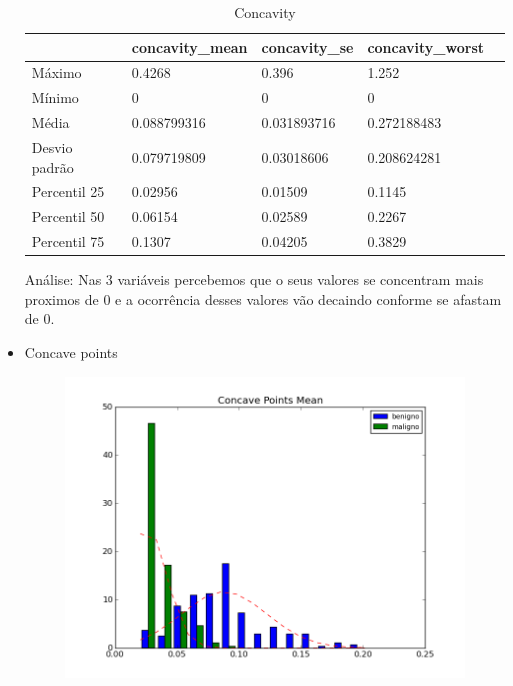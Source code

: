 \documentclass[11pt,a4paper]{article}
\numberwithin{equation}{section}
\begin{document}
\begin{itemize}
\begin{table}[H]
\centering
\caption{Concavity}
\label{my-label}
\begin{tabular}{lllll} \hline
              & concavity\_mean & concavity\_se & concavity\_worst &  \\ \hline
Máximo        & 0.4268          & 0.396         & 1.252            &  \\
Mínimo        & 0               & 0             & 0                &  \\
Média         & 0.088799316     & 0.031893716   & 0.272188483      &  \\
Desvio padrão & 0.079719809     & 0.03018606    & 0.208624281      &  \\
Percentil 25  & 0.02956         & 0.01509       & 0.1145           &  \\
Percentil 50  & 0.06154         & 0.02589       & 0.2267           &  \\
Percentil 75  & 0.1307          & 0.04205       & 0.3829           & \\ \hline
\end{tabular}
\end{table}

Análise: Nas 3 variáveis percebemos que o seus valores se concentram mais proximos de 0 e a ocorrência desses valores vão decaindo conforme se afastam de 0.

\item Concave points
\begin{figure}[H]
\centering
  \includegraphics[width=.5\linewidth]{../img/hist/concave_points_mean}
  \label{fig:test1}
\end{figure}%


\end{itemize}
\end{document}
